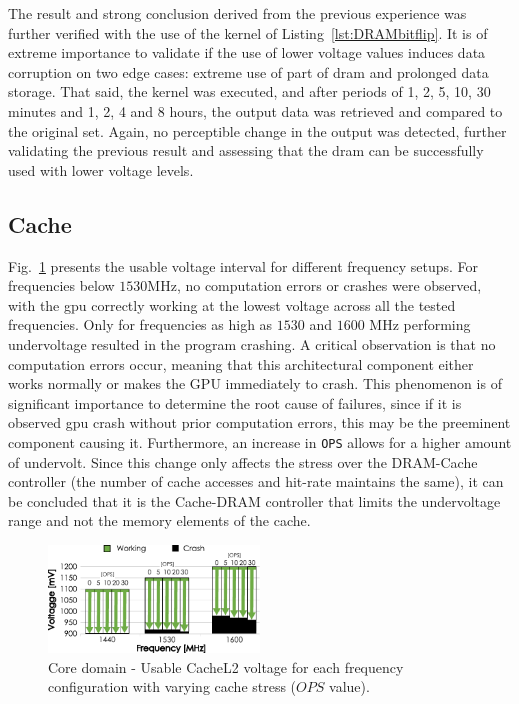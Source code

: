 The result and strong conclusion derived from the previous experience was further verified with the use of the kernel of Listing~\ref{lst:DRAMbitflip}. It is of extreme importance to validate if the use of lower voltage values induces data corruption on two edge cases: extreme use of part of \acrshort{dram} and prolonged data storage. That said, the kernel was executed, and after periods of 1, 2, 5, 10, 30 minutes and 1, 2, 4 and 8 hours, the output data was retrieved and compared to the original set. Again, no perceptible change in the output was detected, further validating the previous result and assessing that the \acrshort{dram} can be successfully used with lower voltage levels. 

\subsection{Cache}

Fig.~\ref{fig:CacheL2_guardband} presents the usable voltage interval for different frequency setups. For frequencies below $1530$MHz, no computation errors or crashes were observed, with the \acrshort{gpu} correctly working at the lowest voltage across all the tested frequencies. Only for frequencies as high as $1530$ and $1600$ MHz performing undervoltage resulted in the program crashing. A critical observation is that no computation errors occur, meaning that this architectural component either works normally or makes the GPU immediately to crash. This phenomenon is of significant importance to determine the root cause of failures, since if it is observed \acrshort{gpu} crash without prior computation errors, this may be the preeminent component causing it.
Furthermore, an increase in \texttt{OPS} allows for a higher amount of undervolt. Since this change only affects the stress over the DRAM-Cache controller (the number of cache accesses and hit-rate maintains the same), it can be concluded that it is the Cache-DRAM controller that limits the undervoltage range and not the memory elements of the cache.


\begin{figure}[htb]
  \centering
  \includegraphics[width=0.5\textwidth]{Figures/GPU_characterization/CacheL2_guardband.pdf}
  \caption{Core domain - Usable CacheL2 voltage for each frequency configuration with varying cache stress ($OPS$ value).}
  \label{fig:CacheL2_guardband}
\end{figure}


